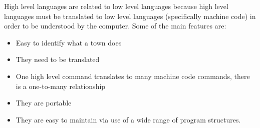   High level languages are related to low level languages because high level languages must be translated to low level languages (specifically machine code) in order to be understood by the computer. Some of the main features are:
  \begin{itemize}
    \setlength{\itemsep}{0em}
    \item Easy to identify what a town does
    \item They need to be translated
    \item One high level command translates to many machine code commands, there is a one-to-many relationship
    \item They are portable
    \item They are easy to maintain via use of a wide range of program structures.
  \end{itemize}
